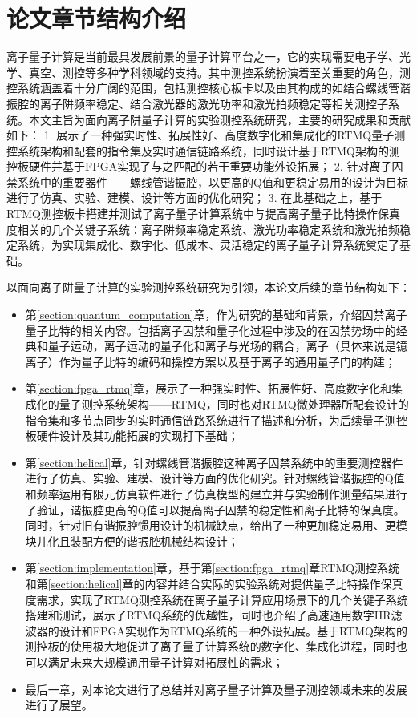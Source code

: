 \section[论文章节结构介绍]{论文章节结构介绍}
离子量子计算是当前最具发展前景的量子计算平台之一，它的实现需要电子学、光学、真空、测控等多种学科领域的支持。其中测控系统扮演着至关重要的角色，测控系统涵盖着十分广阔的范围，包括测控核心板卡以及由其构成的如结合螺线管谐振腔的离子阱频率稳定、结合激光器的激光功率和激光拍频稳定等相关测控子系统。本文主旨为面向离子阱量子计算的实验测控系统研究，主要的研究成果和贡献如下：
1. 展示了一种强实时性、拓展性好、高度数字化和集成化的RTMQ量子测控系统架构和配套的指令集及实时通信链路系统，同时设计基于RTMQ架构的测控板硬件并基于FPGA实现了与之匹配的若干重要功能外设拓展；
2. 针对离子囚禁系统中的重要器件——螺线管谐振腔，以更高的Q值和更稳定易用的设计为目标进行了仿真、实验、建模、设计等方面的优化研究；
3. 在此基础之上，基于RTMQ测控板卡搭建并测试了离子量子计算系统中与提高离子量子比特操作保真度相关的几个关键子系统：离子阱频率稳定系统、激光功率稳定系统和激光拍频稳定系统，为实现集成化、数字化、低成本、灵活稳定的离子量子计算系统奠定了基础。

以面向离子阱量子计算的实验测控系统研究为引领，本论文后续的章节结构如下：
\begin{itemize}
    \item 第\ref{section:quantum_computation}章，作为研究的基础和背景，介绍囚禁离子量子比特的相关内容。包括离子囚禁和量子化过程中涉及的在囚禁势场中的经典和量子运动，离子运动的量子化和离子与光场的耦合，离子（具体来说是镱离子）作为量子比特的编码和操控方案以及基于离子的通用量子门的构建；
    \item 第\ref{section:fpga_rtmq}章，展示了一种强实时性、拓展性好、高度数字化和集成化的量子测控系统架构——RTMQ，同时也对RTMQ微处理器所配套设计的指令集和多节点同步的实时通信链路系统进行了描述和分析，为后续量子测控板硬件设计及其功能拓展的实现打下基础；
    \item 第\ref{section:helical}章，针对螺线管谐振腔这种离子囚禁系统中的重要测控器件进行了仿真、实验、建模、设计等方面的优化研究。针对螺线管谐振腔的Q值和频率运用有限元仿真软件进行了仿真模型的建立并与实验制作测量结果进行了验证，谐振腔更高的Q值可以提高离子囚禁的稳定性和离子比特的保真度。同时，针对旧有谐振腔惯用设计的机械缺点，给出了一种更加稳定易用、更模块儿化且装配方便的谐振腔机械结构设计；
    \item 第\ref{section:implementation}章，基于第\ref{section:fpga_rtmq}章RTMQ测控系统和第\ref{section:helical}章的内容并结合实际的实验系统对提供量子比特操作保真度需求，实现了RTMQ测控系统在离子量子计算应用场景下的几个关键子系统搭建和测试，展示了RTMQ系统的优越性，同时也介绍了高速通用数字IIR滤波器的设计和FPGA实现作为RTMQ系统的一种外设拓展。基于RTMQ架构的测控板的使用极大地促进了离子量子计算系统的数字化、集成化进程，同时也可以满足未来大规模通用量子计算对拓展性的需求；
    \item 最后一章，对本论文进行了总结并对离子量子计算及量子测控领域未来的发展进行了展望。
\end{itemize}